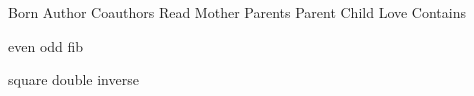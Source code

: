 
\DefRel Born
\DefRel Author
\DefRel Coauthors
\DefRel Read
\DefRel Mother
\DefRel Parents
\DefRel Parent
\DefRel Child
\DefRel Love
\DefRel Contains

\DefFun even
\DefFun odd
\DefFun fib

\DefFun square
\DefFun double
\DefFun inverse

\def\Smile{\rel{\woohoo}}
\def\Frown{\rel{\boohoo}}
\def\euclid{\algorithmstyle{Euclid}}%

\def\oddAs#1{A_{[#1]}}

